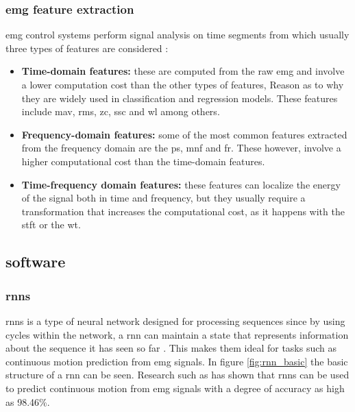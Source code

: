 \subsubsection{\acrshort{emg} feature extraction}

\acrshort{emg} control systems perform signal analysis on time segments from which usually three types of features are considered \cite{EMGprediction}:
\begin{itemize}
    \item \textbf{Time-domain features:} these are computed from the raw \acrfull{emg} and involve a lower computation cost than the other types of features,
    Reason as to why they are widely used in classification and regression models. These features include \acrfull{mav}, \acrfull{rms}, \acrfull{zc}, \acrfull{ssc} and \acrfull{wl}
    among others.
    \item \textbf{Frequency-domain features:} some of the most common features extracted from the frequency domain are the \acrfull{ps}, \acrfull{mnf} and \acrfull{fr}.
    These however, involve a higher computational cost than the time-domain features.
    \item \textbf{Time-frequency domain features:} these features can localize the energy of the signal both in time and frequency, but they usually
    require a transformation that increases the computational cost, as it happens with the \acrfull{stft} or the \acrfull{wt}.
\end{itemize}


\subsection{software}

\subsubsection{\acp{rnn}}
\acp{rnn} is a type of neural network designed for processing sequences since by using cycles within the network, a \acrshort{rnn} can maintain a state that
represents information about the sequence it has seen so far \cite{RNNdef}. This makes them ideal for tasks such as continuous motion prediction from \acrshort{emg} signals.
In figure \ref{fig:rnn_basic} the basic structure of a \acrshort{rnn} can be seen.
Research such as \cite{RNNEMG} has shown that \acp{rnn} can be used to predict continuous motion from \acrshort{emg} signals with a degree of 
accuracy as high as 98.46\%.

